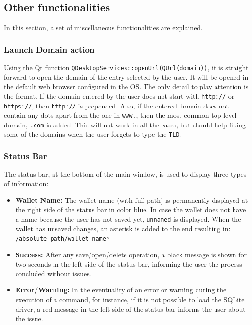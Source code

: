 \subsection{Other functionalities}
In this section, a set of miscellaneous functionalities are explained.

\subsubsection*{Launch Domain action}

Using the Qt function \texttt{QDesktopServices::openUrl(QUrl(domain))}, it is straight forward to open the domain of the entry selected by the user. It will be opened in the default web browser configured in the OS. The only detail to play attention is the format. If the domain entered by the user does not start with \texttt{http://} or \texttt{https://}, then \texttt{http://} is prepended. Also, if the entered domain does not contain any dots apart from the one in \texttt{www.}, then the most common top-level domain, \texttt{.com} is added. This will not work in all the cases, but should help fixing some of the domains when the user forgets to type the \texttt{TLD}.


\subsubsection*{Status Bar}
The status bar, at the bottom of the main window, is used to display three types of information:

\begin{itemize}
\setlength\itemsep{-3pt}

\item \textbf{Wallet Name: }The wallet name (with full path) is permanently displayed at the right side of the status bar in color blue. In case the wallet does not have a name because the user has not saved yet, \texttt{unnamed} is displayed. When the wallet has unsaved changes, an asterisk is added to the end resulting in: \texttt{/absolute\_path/wallet\_name*} 

\item \textbf{Success: }After any save/open/delete operation, a black message is shown for two seconds in the left side of the status bar, informing the user the process concluded without issues.

\item \textbf{Error/Warning: }In the eventuality of an error or warning during the execution of a command, for instance, if it is not possible to load the SQLite driver, a red message in the left side of the status bar informs the user about the issue.
\end{itemize}



